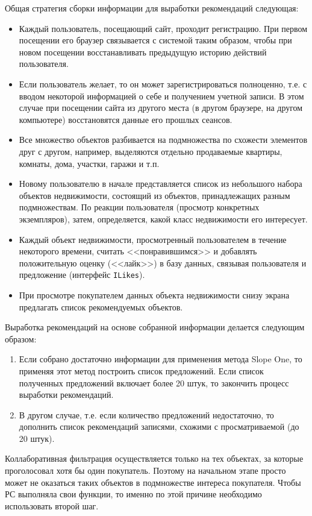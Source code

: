 \documentclass[a4paper,14pt,openany,final]{extreport} %
\begin{document}
{Общая стратегия сборки информации для выработки рекомендаций следующая: %
\begin{itemize}
\item Каждый пользователь, посещающий сайт, проходит регистрацию. При первом посещении его браузер связывается с системой таким образом, чтобы при новом посещении восстанавливать предыдущую историю действий пользователя.
\item Если пользователь желает, то он может зарегистрироваться полноценно, т.е. с вводом некоторой информацией о себе и получением учетной записи. В этом случае при посещении сайта из другого места (в другом браузере, на другом компьютере) восстановятся данные его прошлых сеансов.
\item Все множество объектов разбивается на подмножества по схожести элементов друг с другом, например, выделяются отдельно продаваемые квартиры, комнаты, дома, участки, гаражи и т.п.
\item Новому пользователю в начале представляется список из небольшого набора объектов недвижимости, состоящий из объектов, принадлежащих разным подмножествам. По реакции пользователя (просмотр конкретных экземпляров), затем, определяется, какой класс недвижимости его интересует.
\item Каждый объект недвижимости, просмотренный пользователем в течение некоторого времени, считать <<понравившимся>> и добавлять положительную оценку (<<лайк>>) в базу данных, связывая пользователя и предложение (интерфейс \verb|ILikes|).
\item При просмотре покупателем данных объекта недвижимости снизу экрана предлагать список рекомендуемых объектов.
\end{itemize}

Выработка рекомендаций на основе собранной информации делается следующим образом:
\begin{enumerate}
\item Если собрано достаточно информации для применения метода \foreignlanguage{english}{Slope One}, то применяя этот метод построить список предложений. Если список полученных предложений включает более 20 штук, то закончить процесс выработки рекомендаций.
\item В другом случае, т.е. если количество предложений недостаточно, то дополнить список рекомендаций записями, схожими с просматриваемой (до 20 штук).
\end{enumerate}

Коллаборативная фильтрация осуществляется только на тех объектах, за которые проголосовал хотя бы один покупатель. Поэтому на начальном этапе просто может не оказаться таких объектов в подмножестве интереса покупателя. Чтобы РС выполняла свои функции, то именно по этой причине необходимо использовать второй шаг.

}
\end{document}
